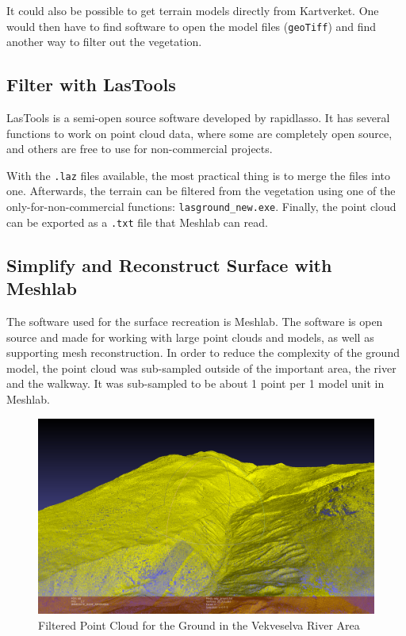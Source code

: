         It could also be possible to get terrain models directly from Kartverket. One would then have to find software to open the model files (\texttt{geoTiff}) and find another way to filter out the vegetation.
    
    \subsection{Filter with LasTools}
        LasTools\cite{lastools} is a semi-open source software developed by rapidlasso. It has several functions to work on point cloud data, where some are completely open source, and others are free to use for non-commercial projects.
        
        With the \texttt{.laz} files available, the most practical thing is to merge the files into one. Afterwards, the terrain can be filtered from the vegetation using one of the only-for-non-commercial functions: \texttt{lasground\_new.exe}. Finally, the point cloud can be exported as a \texttt{.txt} file that Meshlab can read.
    
    \subsection{Simplify and Reconstruct Surface with Meshlab}
        The software used for the surface recreation is Meshlab\cite{LocalChapterEvents:ItalChap:ItalianChapConf2008:129-136}. The software is open source and made for working with large point clouds and models, as well as supporting mesh reconstruction. %
        In order to reduce the complexity of the ground model, the point cloud was sub-sampled outside of the important area, the river and the walkway. It was sub-sampled to be about 1 point per 1 model unit in Meshlab.
        
        \FloatBarrier
        \begin{figure}[htbp]
            \centering
            \includegraphics[width=\ImageWidth]{figures/point_cloud.PNG}
            \caption{Filtered Point Cloud for the Ground in the Vekveselva River Area}
            \label{fig:point_cloud}
        \end{figure}
        \FloatBarrier
        

